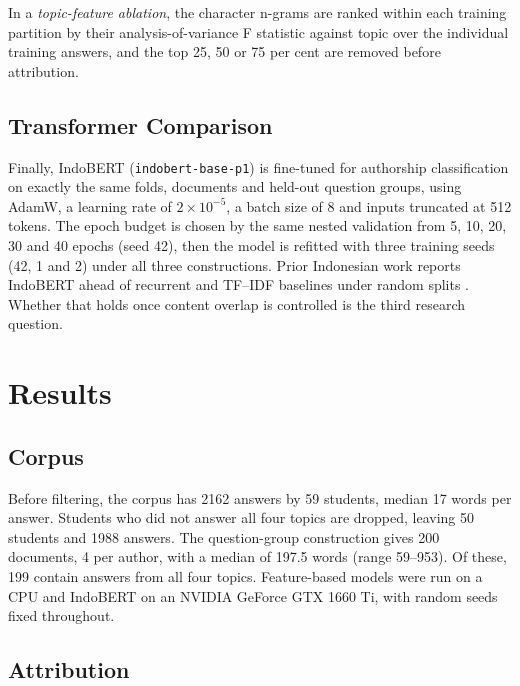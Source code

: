 \documentclass[conference]{IEEEtran}
\begin{document}
In a \textit{topic-feature ablation}, the character n-grams are ranked within each training partition by their analysis-of-variance F statistic against topic over the individual training answers, and the top 25, 50 or 75 per cent are removed before attribution.

\subsection{Transformer Comparison}

Finally, IndoBERT (\texttt{indobert-base-p1}) is fine-tuned for authorship classification on exactly the same folds, documents and held-out question groups, using AdamW, a learning rate of $2 \times 10^{-5}$, a batch size of 8 and inputs truncated at 512 tokens. The epoch budget is chosen by the same nested validation from 5, 10, 20, 30 and 40 epochs (seed 42), then the model is refitted with three training seeds (42, 1 and 2) under all three constructions. Prior Indonesian work reports IndoBERT ahead of recurrent and TF--IDF baselines under random splits \cite{Saputra2023,Saputra2024}. Whether that holds once content overlap is controlled is the third research question.

\section{Results}

\subsection{Corpus}

Before filtering, the corpus has 2162 answers by 59 students, median 17 words per answer. Students who did not answer all four topics are dropped, leaving 50 students and 1988 answers. The question-group construction gives 200 documents, 4 per author, with a median of 197.5 words (range 59--953). Of these, 199 contain answers from all four topics. Feature-based models were run on a CPU and IndoBERT on an NVIDIA GeForce GTX 1660 Ti, with random seeds fixed throughout.

\subsection{Attribution}
\end{document}
